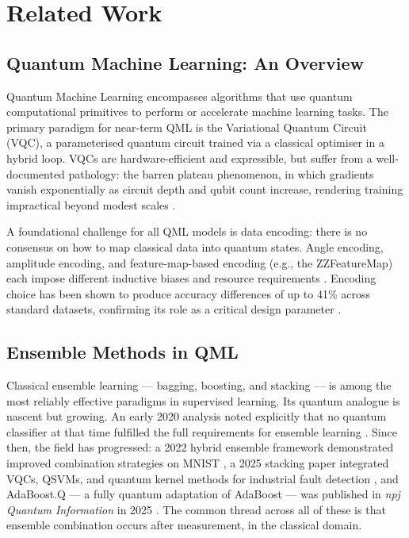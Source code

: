 \documentclass[]{UCD_CS_FYP_Report}
\begin{document}
\chapter{Related Work}

\section{Quantum Machine Learning: An Overview}

Quantum Machine Learning encompasses algorithms that use quantum computational primitives to perform or accelerate machine learning tasks. The primary paradigm for near-term QML is the Variational Quantum Circuit (VQC), a parameterised quantum circuit trained via a classical optimiser in a hybrid loop. VQCs are hardware-efficient and expressible, but suffer from a well-documented pathology: the barren plateau phenomenon, in which gradients vanish exponentially as circuit depth and qubit count increase, rendering training impractical beyond modest scales \cite{mcclean2018barren}.

A foundational challenge for all QML models is data encoding: there is no consensus on how to map classical data into quantum states. Angle encoding, amplitude encoding, and feature-map-based encoding (e.g., the ZZFeatureMap) each impose different inductive biases and resource requirements \cite{weigold2021encoding}. Encoding choice has been shown to produce accuracy differences of up to 41\% across standard datasets, confirming its role as a critical design parameter \cite{tudisco2026angle}.

\section{Ensemble Methods in QML}

Classical ensemble learning --- bagging, boosting, and stacking --- is among the most reliably effective paradigms in supervised learning. Its quantum analogue is nascent but growing. An early 2020 analysis noted explicitly that no quantum classifier at that time fulfilled the full requirements for ensemble learning \cite{schuld2020ceur}. Since then, the field has progressed: a 2022 hybrid ensemble framework demonstrated improved combination strategies on MNIST \cite{schuld2022hybrid}, a 2025 stacking paper integrated VQCs, QSVMs, and quantum kernel methods for industrial fault detection \cite{zhou2025stacking}, and AdaBoost.Q --- a fully quantum adaptation of AdaBoost --- was published in \textit{npj Quantum Information} in 2025 \cite{adaboostq2025}. The common thread across all of these is that ensemble combination occurs after measurement, in the classical domain.
\end{document}
